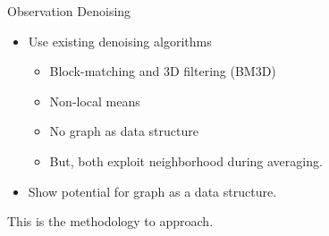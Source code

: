 \begin{frame}{Observation Denoising}

  \begin{itemize}
    \item Use existing denoising algorithms
    \begin{itemize}
      \item Block-matching and 3D filtering (BM3D) \cite{bm3d}
      \item Non-local means \cite{noneLocalMean}
      \item No graph as data structure
      \item But, both exploit neighborhood during averaging.
    \end{itemize}
    \item Show potential for graph as a data structure.
  \end{itemize}

  \begin{tcolorbox}[colback=red!5!white,hide=<-1>, alert=<2>, colframe=red!75!black]
    This is the methodology to approach.
\end{tcolorbox}

  
\end{frame}
